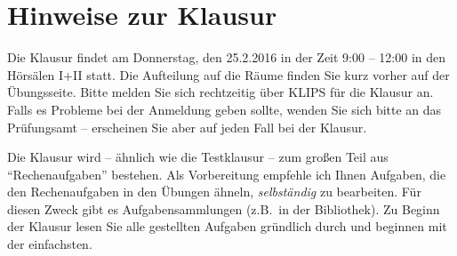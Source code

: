 \documentclass{scrartcl}
\begin{document}
\sepline[.75\textwidth]
\section*{Hinweise zur Klausur}
\label{sec:hinweise_zur_klausur}

Die Klausur findet am Donnerstag, den 25.2.2016 in der Zeit 9:00 -- 12:00 in den Hörsälen I+II statt.
Die Aufteilung auf die Räume finden Sie kurz vorher auf der Übungsseite.
Bitte melden Sie sich rechtzeitig über KLIPS für die Klausur an.
Falls es Probleme bei der Anmeldung geben sollte, wenden Sie sich bitte an das Prüfungsamt -- erscheinen Sie aber auf jeden Fall bei der Klausur.

Die Klausur wird -- ähnlich wie die Testklausur -- zum großen Teil aus ``Rechenaufgaben'' bestehen.
Als Vorbereitung empfehle ich Ihnen Aufgaben, die den Rechenaufgaben in den Übungen ähneln, \emph{selbständig} zu bearbeiten.
Für diesen Zweck gibt es Aufgabensammlungen (z.B.\ in der Bibliothek).
Zu Beginn der Klausur lesen Sie alle gestellten Aufgaben gründlich durch und beginnen mit der einfachsten.
\end{document}
